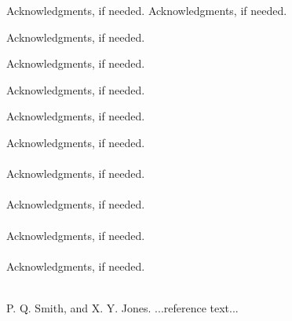 \documentclass{sigplanconf}
\begin{document}
\acks

Acknowledgments, if needed.
Acknowledgments, if needed.

Acknowledgments, if needed.

Acknowledgments, if needed.

Acknowledgments, if needed.

Acknowledgments, if needed.

Acknowledgments, if needed.\\\\
Acknowledgments, if needed.\\\\

Acknowledgments, if needed.\\\\

Acknowledgments, if needed.\\\\

Acknowledgments, if needed.\\\\





\begin{thebibliography}{}
\softraggedright

P. Q. Smith, and X. Y. Jones. ...reference text...

\end{thebibliography}
\end{document}
